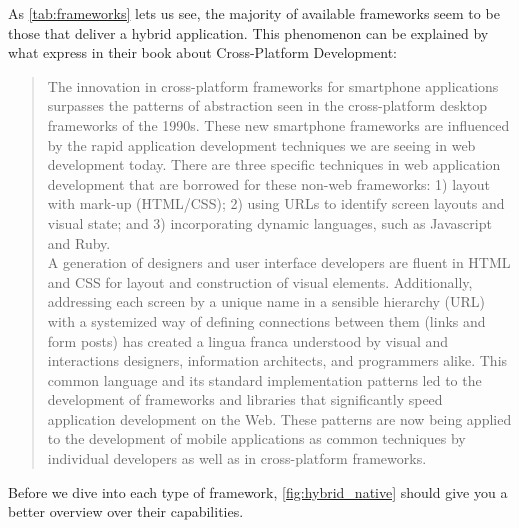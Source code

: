 As \autoref{tab:frameworks} lets us see, the majority of available frameworks seem to be those that deliver a hybrid application. This phenomenon can be explained by what \citeauthor{allen:2010} express in their book about Cross-Platform Development:
\begin{quotation}
The innovation in cross-platform frameworks for smartphone applications surpasses the patterns of abstraction seen in the cross-platform desktop frameworks of the 1990s. These new smartphone frameworks are influenced by the rapid application development techniques we are seeing in web development today. There are three specific techniques in web application development that are borrowed for these non-web frameworks: 1) layout with mark-up (HTML/CSS); 2) using URLs to identify screen layouts and visual state; and 3) incorporating dynamic languages, such as Javascript and Ruby.\\

A generation of designers and user interface developers are fluent in HTML and CSS for layout and construction of visual elements. Additionally, addressing each screen by a unique name in a sensible hierarchy (URL) with a systemized way of defining connections between them (links and form posts) has created a lingua franca understood by visual and interactions designers, information architects, and programmers alike. This common language and its standard implementation patterns led to the development of frameworks and libraries that significantly speed application development on the Web. These patterns are now being applied to the development of mobile applications as common techniques by individual developers as well as in cross-platform frameworks.
\cite[p. 23]{allen:2010}
\end{quotation}
Before we dive into each type of framework, \autoref{fig:hybrid_native} should give you a better overview over their capabilities.\\

